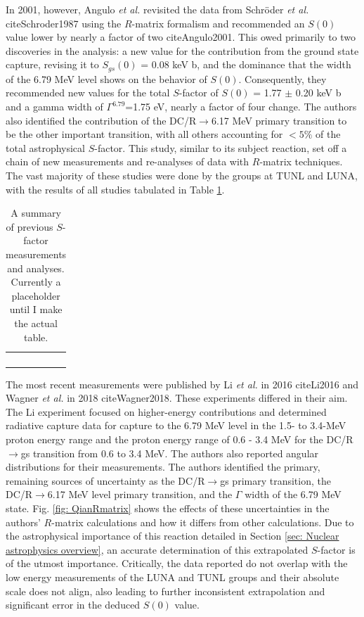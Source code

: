 In 2001, however, Angulo \textit{et al.} revisited the data from Schr{\"o}der \textit{et al.} cite{Schroder1987} using the $R$-matrix formalism and recommended an $S(0)$ value lower by nearly a factor of two cite{Angulo2001}. This owed primarily to two discoveries in the analysis: a new value for the contribution from the ground state capture, revising it to $S_{gs}(0)$ = 0.08 keV b, and the dominance that the width of the 6.79 MeV level shows on the behavior of $S(0)$. Consequently, they recommended new values for the total $S$-factor of $S(0)$ = 1.77 $\pm$ 0.20 keV b and a gamma width of $\Gamma^{6.79}$=1.75 eV, nearly a factor of four change. The authors also identified the contribution of the DC/R$\rightarrow$6.17 MeV primary transition to be the other important transition, with all others accounting for $< 5\%$ of the total astrophysical $S$-factor. This study, similar to its subject reaction, set off a chain of new measurements and re-analyses of data with $R$-matrix techniques. The vast majority of these studies were done by the groups at TUNL and LUNA, with the results of all studies tabulated in Table \ref{table: s factors}.

\begin{table}[]
\begin{tabular}{lllll}
 &  &  &  &  \\
 &  &  &  &  \\
 &  &  &  &  \\
 &  &  &  & 
\end{tabular}
\label{table: s factors}
\caption{A summary of previous $S$-factor measurements and analyses. Currently a placeholder until I make the actual table.}
\end{table}

The most recent measurements were published by Li \textit{et al.} in 2016 cite{Li2016} and Wagner \textit{et al.} in 2018 cite{Wagner2018}. These experiments differed in their aim. The Li experiment focused on higher-energy contributions and determined radiative capture data for capture to the 6.79 MeV level in the 1.5- to 3.4-MeV proton energy range and the proton energy range of 0.6 - 3.4 MeV for the DC/R$\rightarrow$gs transition from 0.6 to 3.4 MeV. The authors also reported angular distributions for their measurements. The authors identified the primary, remaining sources of uncertainty as the DC/R$\rightarrow$gs primary transition, the DC/R$\rightarrow$6.17 MeV level primary transition, and the $\Gamma$ width of the 6.79 MeV state. Fig. \ref{fig: QianRmatrix} shows the effects of these uncertainties in the authors' $R$-matrix calculations and how it differs from other calculations. Due to the astrophysical importance of this reaction detailed in Section \ref{sec: Nuclear astrophysics overview}, an accurate determination of this extrapolated $S$-factor is of the utmost importance. Critically, the data reported do not overlap with the low energy measurements of the LUNA and TUNL groups and their absolute scale does not align, also leading to further inconsistent extrapolation and significant error in the deduced $S(0)$ value.

